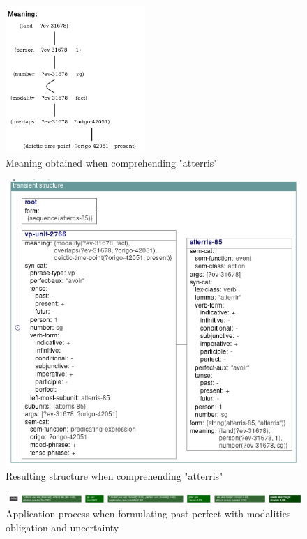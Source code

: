\documentclass[a4paper,10pt]{article}
\begin{document}
\begin{figure}[!h]
    \centering
    \includegraphics[width=200px]{meaning-present.png}
    \caption{Meaning obtained when comprehending "atterris"}
    \label{meaning-present}
\end{figure}

\begin{figure}[!h]
    \centering
    \includegraphics[width=\textwidth]{resulting-structure-present.png}
    \caption{Resulting structure when comprehending "atterris"}
    \label{resulting-structure-present}
\end{figure}

\begin{figure}[!h]
    \centering
    \includegraphics[width=\textwidth]{application-process-mod-aux-subj-PQP-form.png}
    \caption{Application process when formulating past perfect with modalities obligation and uncertainty}
    \label{application-process-mod-aux-subj-PQP-form}
\end{figure}
\end{document}
